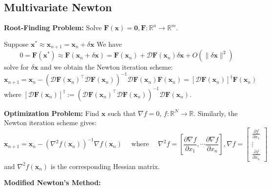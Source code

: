 \documentclass[11pt]{article}
\theoremstyle{plain} %
\newenvironment{topic}
{\color{C2}\normalfont\begin{framed}\begingroup }
  {\endgroup\end{framed}}
\theoremstyle{remark}
\begin{document}
\subsection{Multivariate Newton}
\begin{topic}
  \textbf{Root-Finding Problem:} Solve $\mathbf{F}(\mathbf{x})=\boldsymbol{0} , \mathbf{F}:\mathbb{R}^n \rightarrow \mathbb{R}^m$.

  Suppose $\mathbf{x}^* \approx \mathbf{x}_{n+1} = \mathbf{x}_n+\delta \mathbf{x}$ We have
  $$
    0=\mathbf{F}\left(\mathbf{x}^*\right)\approx\mathbf{F}\left(\mathbf{x}_n+\delta \mathbf{x}\right)=\mathbf{F}\left(\mathbf{x}_n\right)+\mathcal{D} \mathbf{F}\left(\mathbf{x}_n\right) \delta \mathbf{x}+O(\|\delta \mathbf{x}\|^2)
  $$
  solve for $\delta \mathbf{x}$ and we obtain the Newton iteration scheme:
  $$
    \mathbf{x}_{n+1}=\mathbf{x}_n-\left(\mathcal{\mathcal{D}} \mathbf{F}\left(\mathbf{x}_n\right)^{\top} \mathcal{D} \mathbf{F}\left(\mathbf{x}_n\right)\right)^{-1} \mathcal{D} \mathbf{F}\left(\mathbf{x}_n\right) \mathbf{F}\left(\mathbf{x}_n\right)
    = \left[\mathcal{D} \mathbf{F}\left(\mathbf{x}_n\right)\right]^\dagger\mathbf{F}\left(\mathbf{x}_n\right)
  $$
  where $\left[\mathcal{D} \mathbf{F}\left(\mathbf{x}_n\right)\right]^\dagger := \left(\mathcal{\mathcal{D}} \mathbf{F}\left(\mathbf{x}_n\right)^{\top} \mathcal{D} \mathbf{F}\left(\mathbf{x}_n\right)\right)^{-1} \mathcal{D} \mathbf{F}\left(\mathbf{x}_n\right)$.


  \textbf{Optimization Problem:} Find $\mathbf{x}$ such that $\nabla f= 0$,  $f: \mathbb{R}^N \rightarrow \mathbb{R}$.
  Similarly, the Newton iteration scheme gives:
  $$
    \mathbf{x}_{n+1}=\mathbf{x}_n-\left(\nabla^2 f\left(\mathbf{x}_n\right)\right)^{-1} \nabla f\left(\mathbf{x}_n\right)
    \quad \text{ where } \quad
    \nabla^2 f=\left[\frac{\partial \nabla f}{\partial x_1}, \cdots \frac{\partial \nabla f}{\partial x_n}\right], \nabla f=\left[\begin{array}{c}
        \frac{\partial f}{\partial x_1} \\
        \vdots                          \\
        \frac{\partial f}{\partial x_n}
      \end{array}\right]
  $$
  and $\nabla^2 f\left(\mathbf{x}_n\right)$ is the corresponding Hessian matrix.

  \textbf{Modified Newton's Method:}


\end{topic}
\end{document}
